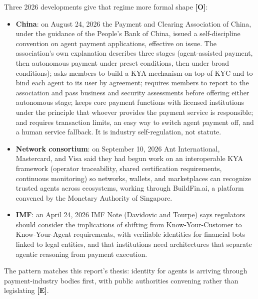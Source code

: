 \documentclass[11pt,letterpaper]{article}
\begin{document}
Three 2026 developments give that regime more formal shape \textbf{[O]}:
\begin{itemize}
  \item \textbf{China}: on August 24, 2026 the Payment and Clearing Association of China, under the guidance of the People's Bank of China, issued a self-discipline convention on agent payment applications, effective on issue. The association's own explanation describes three stages (agent-assisted payment, then autonomous payment under preset conditions, then under broad conditions); asks members to build a KYA mechanism on top of KYC and to bind each agent to its user by agreement; requires members to report to the association and pass business and security assessments before offering either autonomous stage; keeps core payment functions with licensed institutions under the principle that whoever provides the payment service is responsible; and requires transaction limits, an easy way to switch agent payment off, and a human service fallback. It is industry self-regulation, not statute.
  \item \textbf{Network consortium}: on September 10, 2026 Ant International, Mastercard, and Visa said they had begun work on an interoperable KYA framework (operator traceability, shared certification requirements, continuous monitoring) so networks, wallets, and marketplaces can recognize trusted agents across ecosystems, working through BuildFin.ai, a platform convened by the Monetary Authority of Singapore.
  \item \textbf{IMF}: an April 24, 2026 IMF Note (Davidovic and Tourpe) says regulators should consider the implications of shifting from Know-Your-Customer to Know-Your-Agent requirements, with verifiable identities for financial bots linked to legal entities, and that institutions need architectures that separate agentic reasoning from payment execution.
\end{itemize}
The pattern matches this report's thesis: identity for agents is arriving through payment-industry bodies first, with public authorities convening rather than legislating \textbf{[E]}.
\end{document}
